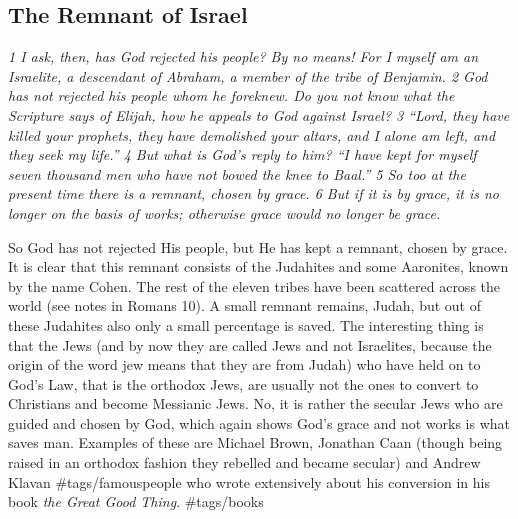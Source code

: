 \subsection{The Remnant of Israel} \emph{1 I ask, then, has God rejected his
people? By no means! For I myself am an Israelite, a descendant of
Abraham, a member of the tribe of Benjamin. 2 God has not rejected his
people whom he foreknew. Do you not know what the Scripture says of
Elijah, how he appeals to God against Israel? 3 ``Lord, they have killed
your prophets, they have demolished your altars, and I alone am left,
and they seek my life.'' 4 But what is God's reply to him? ``I have kept
for myself seven thousand men who have not bowed the knee to Baal.'' 5
So too at the present time there is a remnant, chosen by grace. 6 But if
it is by grace, it is no longer on the basis of works; otherwise grace
would no longer be grace.}

So God has not rejected His people, but He has kept a remnant, chosen by
grace. It is clear that this remnant consists of the Judahites and some
Aaronites, known by the name Cohen. The rest of the eleven tribes have
been scattered across the world (see notes in Romans 10). A small
remnant remains, Judah, but out of these Judahites also only a small
percentage is saved. The interesting thing is that the Jews (and by now
they are called Jews and not Israelites, because the origin of the word
jew means that they are from Judah) who have held on to God's Law, that
is the orthodox Jews, are usually not the ones to convert to Christians
and become Messianic Jews. No, it is rather the secular Jews who are
guided and chosen by God, which again shows God's grace and not works is
what saves man. Examples of these are Michael Brown, Jonathan Caan
(though being raised in an orthodox fashion they rebelled and became
secular) and Andrew Klavan \#tags/famouspeople who wrote extensively
about his conversion in his book \emph{the Great Good Thing}.
\#tags/books


